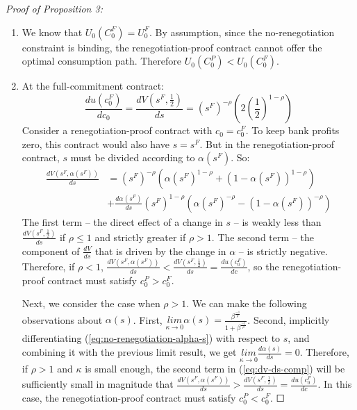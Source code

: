 \documentclass[11pt,english]{article}
\theoremstyle{plain}
\theoremstyle{definition}
\begin{document}
\emph{Proof of Proposition 3:}
\begin{enumerate} [label=\alph*)]
\item We know that $U_{0}\left(C_{0}^{F}\right)=U_{0}^{F}$.
By assumption, since the no-renegotiation constraint is binding,
the renegotiation-proof contract cannot offer the optimal consumption
path. Therefore $U_{0}\left(C_{0}^{P}\right)<U_{0}\left(C_{0}^{F}\right)$.

\item At the full-commitment contract: 
\begin{equation}
\frac{du\left(c_{0}^{F}\right)}{dc_{0}}=\frac{dV\left(s^{F},\frac{1}{2}\right)}{ds}=\left(s^{F}\right)^{-\rho}\left(2\left(\frac{1}{2}\right)^{1-\rho}\right)
\end{equation}
Consider a renegotiation-proof contract with $c_{0}=c_{0}^{F}$. To
keep bank profits zero, this contract would also have $s=s^{F}$.
But in the renegotiation-proof contract, $s$ must be divided according
to $\alpha\left(s^{F}\right)$. So: 
\begin{align}
\frac{dV\left(s^{F},\alpha\left(s^{F}\right)\right)}{ds} & =\left(s^{F}\right)^{-\rho}\left(\alpha\left(s^{F}\right)^{1-\rho}+\left(1-\alpha\left(s^{F}\right)\right)^{1-\rho}\right)\nonumber \\
 & +\frac{d\alpha\left(s^{F}\right)}{ds}\left(s^{F}\right)^{1-\rho}\left(\alpha\left(s^{F}\right)^{-\rho}-\left(1-\alpha\left(s^{F}\right)\right)^{-\rho}\right)\label{eq:dv-ds-comp}
\end{align}
The first term -- the direct effect of a change in $s$ -- is
weakly less than $\frac{dV\left(s^{F},\frac{1}{2}\right)}{ds}$ if
$\rho\leq1$ and strictly greater if $\rho>1$. The second term -- the
component of $\frac{dV}{ds}$ that is driven by the change in $\alpha$ -- is
strictly negative. Therefore, if $\rho<1$, $\frac{dV\left(s^{F},\alpha\left(s^{F}\right)\right)}{ds}<\frac{dV\left(s^{F},\frac{1}{2}\right)}{ds}=\frac{du\left(c_{0}^{F}\right)}{dc}$,
so the renegotiation-proof contract must satisfy $c_{0}^{P}>c_{0}^{F}$.

Next, we consider the case when $\rho>1$. We can make the following
observations about $\alpha\left(s\right)$. First, $\underset{\kappa\rightarrow0}{lim}\alpha\left(s\right)=\frac{\beta^{\frac{-1}{\rho}}}{1+\beta^{\frac{-1}{\rho}}}$.
Second, implicitly differentiating  (\ref{eq:no-renegotiation-alpha-s})
with respect to $s$, and combining it with the previous limit result,
we get $\underset{\kappa\rightarrow0}{lim}\frac{d\alpha\left(s\right)}{ds}=0$.
Therefore, if $\rho>1$ and $\kappa$ is small enough, the second
term in (\ref{eq:dv-ds-comp}) will be sufficiently small in
magnitude that $\frac{dV\left(s^{F},\alpha\left(s^{F}\right)\right)}{ds}>\frac{dV\left(s^{F},\frac{1}{2}\right)}{ds}=\frac{du\left(c_{0}^{F}\right)}{dc}$.
In this case, the renegotiation-proof contract must satisfy $c_{0}^{P}<c_{0}^{F}$.
$\Square$
\end{enumerate}
\end{document}
